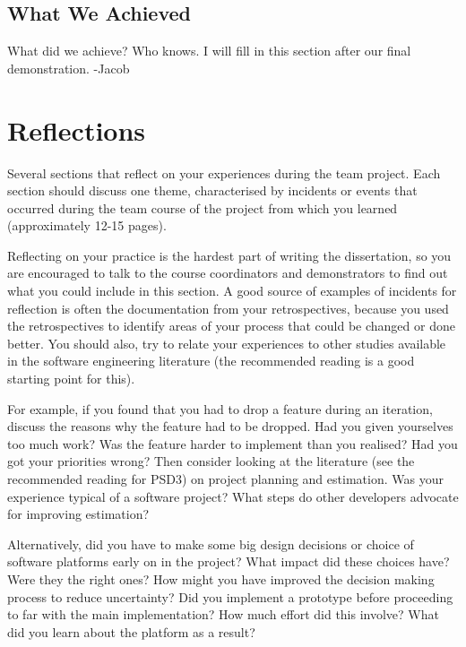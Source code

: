 \documentclass{l3proj}
\begin{document}
\section{What We Achieved}
\label{achievements}

What did we achieve? Who knows. I will fill in this section after our final demonstration. -Jacob

\chapter{Reflections}

Several sections that reflect on your experiences during the team project. Each section should discuss one theme, characterised by incidents or events that occurred during the team course of the project from which you learned (approximately 12-15 pages).

Reflecting on your practice is the hardest part of writing the dissertation, so you are encouraged to talk to the course coordinators and demonstrators to find out what you could include in this section. A good source of examples of incidents for reflection is often the documentation from your retrospectives, because you used the retrospectives to identify areas of your process that could be changed or done better. You should also, try to relate your experiences to other studies available in the software engineering literature (the recommended reading is a good starting point for this).

For example, if you found that you had to drop a feature during an iteration, discuss the reasons why the feature had to be dropped. Had you given yourselves too much work? Was the feature harder to implement than you realised? Had you got your priorities wrong? Then consider looking at the literature (see the recommended reading for PSD3) on project planning and estimation. Was your experience typical of a software project? What steps do other developers advocate for improving estimation?

Alternatively, did you have to make some big design decisions or choice of software platforms early on in the project? What impact did these choices have? Were they the right ones? How might you have improved the decision making process to reduce uncertainty? Did you implement a prototype before proceeding to far with the main implementation? How much effort did this involve? What did you learn about the platform as a result?
\end{document}
